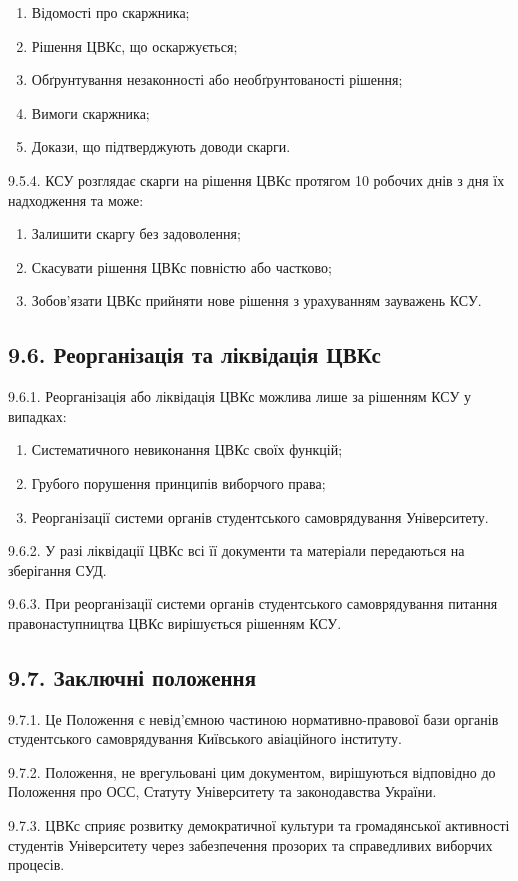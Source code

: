         \begin{enumerate}[label=\alph*)]
            \item Відомості про скаржника;
            \item Рішення ЦВКс, що оскаржується;
            \item Обґрунтування незаконності або необґрунтованості рішення;
            \item Вимоги скаржника;
            \item Докази, що підтверджують доводи скарги.
        \end{enumerate}

    9.5.4. КСУ розглядає скарги на рішення ЦВКс протягом 10 робочих днів з дня їх надходження та може:

        \begin{enumerate}[label=\alph*)]
            \item Залишити скаргу без задоволення;
            \item Скасувати рішення ЦВКс повністю або частково;
            \item Зобов'язати ЦВКс прийняти нове рішення з урахуванням зауважень КСУ.
        \end{enumerate}

\subsection*{9.6. Реорганізація та ліквідація ЦВКс}
    9.6.1. Реорганізація або ліквідація ЦВКс можлива лише за рішенням КСУ у випадках:

        \begin{enumerate}[label=\alph*)]
            \item Систематичного невиконання ЦВКс своїх функцій;
            \item Грубого порушення принципів виборчого права;
            \item Реорганізації системи органів студентського самоврядування Університету.
        \end{enumerate}

    9.6.2. У разі ліквідації ЦВКс всі її документи та матеріали передаються на зберігання СУД.

    9.6.3. При реорганізації системи органів студентського самоврядування питання правонаступництва ЦВКс вирішується рішенням КСУ.

\subsection*{9.7. Заключні положення}
    9.7.1. Це Положення є невід'ємною частиною нормативно-правової бази органів студентського самоврядування Київського авіаційного інституту.

    9.7.2. Положення, не врегульовані цим документом, вирішуються відповідно до Положення про ОСС, Статуту Університету та законодавства України.

    9.7.3. ЦВКс сприяє розвитку демократичної культури та громадянської активності студентів Університету через забезпечення прозорих та справедливих виборчих процесів.